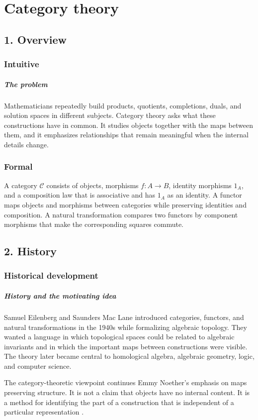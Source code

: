 \clearpage\chapter{Category theory}
\section*{1. Overview}
\subsection*{Intuitive}
\paragraph{The problem}

Mathematicians repeatedly build products, quotients, completions, duals, and solution spaces in different subjects. Category theory asks what these constructions have in common. It studies objects together with the maps between them, and it emphasizes relationships that remain meaningful when the internal details change.



\subsection*{Formal}
A category $\mathcal C$ consists of objects, morphisms $f:A\to B$, identity morphisms $1_A$, and a composition law that is associative and has $1_A$ as an identity. A functor maps objects and morphisms between categories while preserving identities and composition. A natural transformation compares two functors by component morphisms that make the corresponding squares commute.
\section*{2. History}
\subsection*{Historical development}
\begin{historylist}
\paragraph{History and the motivating idea}

Samuel Eilenberg and Saunders Mac Lane introduced categories, functors, and natural transformations in the 1940s while formalizing algebraic topology. They wanted a language in which topological spaces could be related to algebraic invariants and in which the important maps between constructions were visible. The theory later became central to homological algebra, algebraic geometry, logic, and computer science.

The category-theoretic viewpoint continues Emmy Noether's emphasis on maps preserving structure. It is not a claim that objects have no internal content. It is a method for identifying the part of a construction that is independent of a particular representation \cite{category_theory_ref1,category_theory_ref2}.

\end{historylist}
